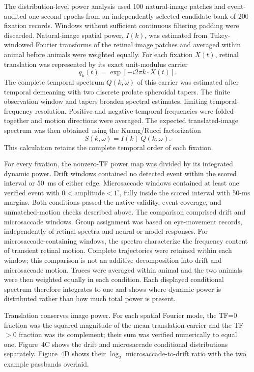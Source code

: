 \documentclass{lite}
\begin{document}
The distribution-level power analysis used 100 natural-image patches and event-audited one-second epochs from an independently selected candidate bank of 200 fixation records. Windows without sufficient continuous filtering padding were discarded. Natural-image spatial power, $I(k)$, was estimated from Tukey-windowed Fourier transforms of the retinal image patches and averaged within animal before animals were weighted equally. For each fixation $X(t)$, retinal translation was represented by its exact unit-modulus carrier
\begin{equation}
q_k(t)=\exp[-i2\pi k\cdot X(t)] .
\end{equation}
The complete temporal spectrum $Q(k,\omega)$ of this carrier was estimated after temporal demeaning with two discrete prolate spheroidal tapers. The finite observation window and tapers broaden spectral estimates, limiting temporal-frequency resolution. Positive and negative temporal frequencies were folded together and motion directions were averaged. The expected translated-image spectrum was then obtained using the Kuang/Rucci factorization
\begin{equation}
S(k,\omega)=I(k)\,Q(k,\omega).
\end{equation}
This calculation retains the complete temporal order of each fixation.

For every fixation, the nonzero-TF power map was divided by its integrated dynamic power. Drift windows contained no detected event within the scored interval or 50~ms of either edge. Microsaccade windows contained at least one verified event with $0<\mathrm{amplitude}<1^\circ$, fully inside the scored interval with 50-ms margins. Both conditions passed the native-validity, event-coverage, and unmatched-motion checks described above. The comparison comprised \FigFourDriftWindows{} drift and \FigFourMicrosaccadeWindows{} microsaccade windows. Group assignment was based on eye-movement records, independently of retinal spectra and neural or model responses. For microsaccade-containing windows, the spectra characterize the frequency content of transient retinal motion. Complete trajectories were retained within each window; this comparison is not an additive decomposition into drift and microsaccade motion. Traces were averaged within animal and the two animals were then weighted equally in each condition. Each displayed conditional spectrum therefore integrates to one and shows where dynamic power is distributed rather than how much total power is present.

Translation conserves image power. For each spatial Fourier mode, the TF=0 fraction was the squared magnitude of the mean translation carrier and the TF$>0$ fraction was its complement; their sum was verified numerically to equal one. Figure~4C shows the drift and microsaccade conditional distributions separately. Figure~4D shows their $\log_2$ microsaccade-to-drift ratio with the two example passbands overlaid.
\end{document}
